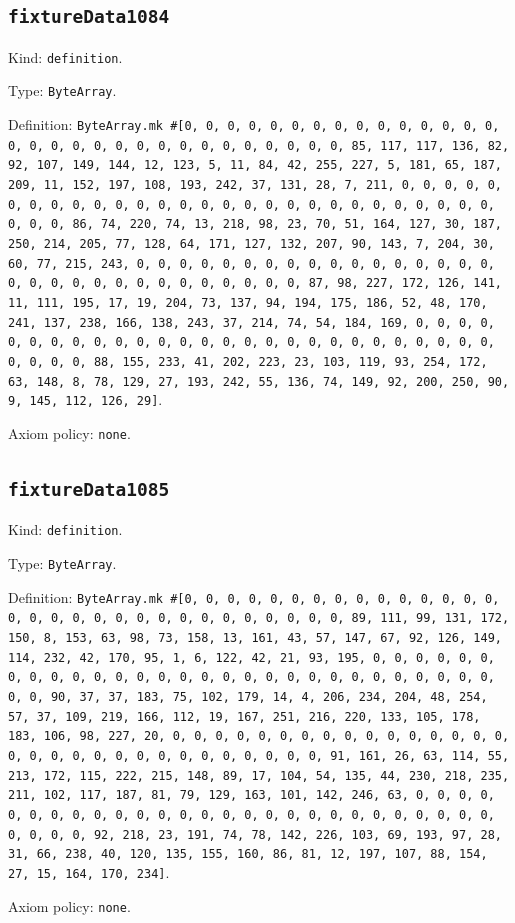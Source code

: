 \documentclass[11pt]{article}
\begin{document}
\subsection*{\texttt{fixtureData1084}}
\noindent Kind: \texttt{definition}.\par
\noindent Type: \texttt{ByteArray}.\par
\noindent Definition: \texttt{ByteArray.mk \#[0, 0, 0, 0, 0, 0, 0, 0, 0, 0, 0, 0, 0, 0, 0, 0, 0, 0, 0, 0, 0, 0, 0, 0, 0, 0, 0, 0, 0, 0, 0, 85, 117, 117, 136, 82, 92, 107, 149, 144, 12, 123, 5, 11, 84, 42, 255, 227, 5, 181, 65, 187, 209, 11, 152, 197, 108, 193, 242, 37, 131, 28, 7, 211, 0, 0, 0, 0, 0, 0, 0, 0, 0, 0, 0, 0, 0, 0, 0, 0, 0, 0, 0, 0, 0, 0, 0, 0, 0, 0, 0, 0, 0, 0, 0, 86, 74, 220, 74, 13, 218, 98, 23, 70, 51, 164, 127, 30, 187, 250, 214, 205, 77, 128, 64, 171, 127, 132, 207, 90, 143, 7, 204, 30, 60, 77, 215, 243, 0, 0, 0, 0, 0, 0, 0, 0, 0, 0, 0, 0, 0, 0, 0, 0, 0, 0, 0, 0, 0, 0, 0, 0, 0, 0, 0, 0, 0, 0, 0, 87, 98, 227, 172, 126, 141, 11, 111, 195, 17, 19, 204, 73, 137, 94, 194, 175, 186, 52, 48, 170, 241, 137, 238, 166, 138, 243, 37, 214, 74, 54, 184, 169, 0, 0, 0, 0, 0, 0, 0, 0, 0, 0, 0, 0, 0, 0, 0, 0, 0, 0, 0, 0, 0, 0, 0, 0, 0, 0, 0, 0, 0, 0, 0, 88, 155, 233, 41, 202, 223, 23, 103, 119, 93, 254, 172, 63, 148, 8, 78, 129, 27, 193, 242, 55, 136, 74, 149, 92, 200, 250, 90, 9, 145, 112, 126, 29]}.\par
\noindent Axiom policy: \texttt{none}.\par
\subsection*{\texttt{fixtureData1085}}
\noindent Kind: \texttt{definition}.\par
\noindent Type: \texttt{ByteArray}.\par
\noindent Definition: \texttt{ByteArray.mk \#[0, 0, 0, 0, 0, 0, 0, 0, 0, 0, 0, 0, 0, 0, 0, 0, 0, 0, 0, 0, 0, 0, 0, 0, 0, 0, 0, 0, 0, 0, 0, 89, 111, 99, 131, 172, 150, 8, 153, 63, 98, 73, 158, 13, 161, 43, 57, 147, 67, 92, 126, 149, 114, 232, 42, 170, 95, 1, 6, 122, 42, 21, 93, 195, 0, 0, 0, 0, 0, 0, 0, 0, 0, 0, 0, 0, 0, 0, 0, 0, 0, 0, 0, 0, 0, 0, 0, 0, 0, 0, 0, 0, 0, 0, 0, 90, 37, 37, 183, 75, 102, 179, 14, 4, 206, 234, 204, 48, 254, 57, 37, 109, 219, 166, 112, 19, 167, 251, 216, 220, 133, 105, 178, 183, 106, 98, 227, 20, 0, 0, 0, 0, 0, 0, 0, 0, 0, 0, 0, 0, 0, 0, 0, 0, 0, 0, 0, 0, 0, 0, 0, 0, 0, 0, 0, 0, 0, 0, 0, 91, 161, 26, 63, 114, 55, 213, 172, 115, 222, 215, 148, 89, 17, 104, 54, 135, 44, 230, 218, 235, 211, 102, 117, 187, 81, 79, 129, 163, 101, 142, 246, 63, 0, 0, 0, 0, 0, 0, 0, 0, 0, 0, 0, 0, 0, 0, 0, 0, 0, 0, 0, 0, 0, 0, 0, 0, 0, 0, 0, 0, 0, 0, 0, 92, 218, 23, 191, 74, 78, 142, 226, 103, 69, 193, 97, 28, 31, 66, 238, 40, 120, 135, 155, 160, 86, 81, 12, 197, 107, 88, 154, 27, 15, 164, 170, 234]}.\par
\noindent Axiom policy: \texttt{none}.\par
\end{document}
